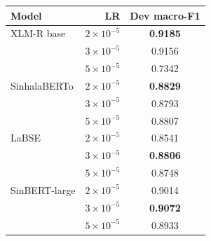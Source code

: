 \begin{tabular}{lrc}
\toprule
Model & LR & Dev macro-F1 \\
\midrule
XLM-R base & $2\times10^{-5}$ & \textbf{0.9185} \\
 & $3\times10^{-5}$ & 0.9156 \\
 & $5\times10^{-5}$ & 0.7342 \\
\midrule
SinhalaBERTo & $2\times10^{-5}$ & \textbf{0.8829} \\
 & $3\times10^{-5}$ & 0.8793 \\
 & $5\times10^{-5}$ & 0.8807 \\
\midrule
LaBSE & $2\times10^{-5}$ & 0.8541 \\
 & $3\times10^{-5}$ & \textbf{0.8806} \\
 & $5\times10^{-5}$ & 0.8748 \\
\midrule
SinBERT-large & $2\times10^{-5}$ & 0.9014 \\
 & $3\times10^{-5}$ & \textbf{0.9072} \\
 & $5\times10^{-5}$ & 0.8933 \\
\bottomrule
\end{tabular}
